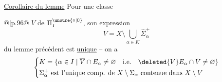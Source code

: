 \uline{Corollaire du lemme} Pour une classe

\noindent\begin{tabular}{@{}|p{.96\linewidth}@{}}
$V$ de $\Pi_I^{\unsure{\circ|0}}$, son expression
\[
V=X\setminus\bigcup_{\alpha\in K}\widehat{\Sigma}_\alpha^+
\]
du lemme précédent est \uline{unique} -- on a
{\small
\[
\left\{\begin{aligned}
&K=\{\alpha\in I\mid\overline V\cap E_\alpha\ne\varnothing\quad\text{i.e.}\quad\deleted{V}E_\alpha\cap\dot V\ne\varnothing\}\\
&\Sigma_\alpha^+\ \text{est l'unique comp. de }X\setminus\Sigma_\alpha\ \text{contenue dans }X\setminus V
\end{aligned}\right.
\]}
\end{tabular}
